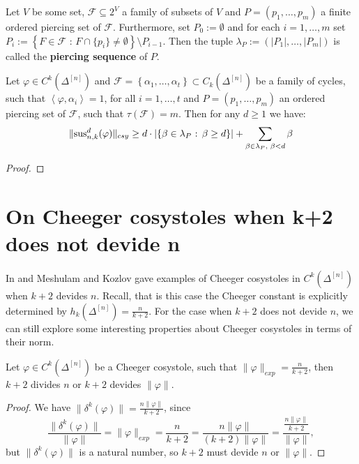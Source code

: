 \begin{defi}
Let \(V\) be some set, \(\mathcal{F}\subseteq 2^V\) a family of subsets of \(V\) and \(P=(p_1,\ldots,p_m)\) a finite ordered piercing set of \(\mathcal{F}\). Furthermore, set \(P_0:=\emptyset\) and for each \(i=1,\ldots,m\) set \(P_i:=\left\{F\in\mathcal{F}\text{ : }F\cap\{p_i\}\neq\emptyset\right\}\setminus P_{i-1}\). Then the tuple \(\lambda_P:=(|P_1|,\ldots,|P_m|)\) is called the \textbf{piercing sequence} of \(P\).
\end{defi}

\begin{prop}
Let \(\varphi\in C^k(\Delta^{[n]})\) and \(\mathcal{F}=\left\{\alpha_1,\ldots,\alpha_t\right\}\subset C_k(\Delta^{[n]})\) be a family of cycles, such that \(\left\langle\varphi,\alpha_i\right\rangle=1\), for all \(i=1,\ldots,t\) and \(P=(p_1,\ldots,p_m)\) an ordered piercing set of \(\mathcal{F}\), such that \(\tau(\mathcal{F})=m\). Then for any \(d\geq 1\) we have:
\[
\|\mathrm{sus}_{n,k}^d(\varphi)\|_{csy}\geq d\cdot\left|\left\{\beta\in\lambda_P\text{ : }\beta\geq d\right\}\right|+\sum\limits_{\beta\in\lambda_P\text{, }\beta<d}\beta
\]
\begin{proof}

\end{proof}
\end{prop}

\section{On Cheeger cosystoles when k+2 does not devide n}

In \cite{4} and \cite{6} Meshulam and Kozlov gave examples of Cheeger cosystoles in \(C^k(\Delta^{[n]})\) when \(k+2\) devides \(n\). Recall, that is this case the Cheeger constant is explicitly determined by \(h_k(\Delta^{[n]})=\frac{n}{k+2}\). For the case when \(k+2\) does not devide \(n\), we can still explore some interesting properties about Cheeger cosystoles in terms of their norm.

\begin{prop}
Let \(\varphi\in C^k(\Delta^{[n]})\) be a Cheeger cosystole, such that \(\|\varphi\|_{exp}=\frac{n}{k+2}\), then \(k+2\) divides \(n\) or \(k+2\) devides \(\|\varphi\|\).
\begin{proof}
We have \(\|\delta^k(\varphi)\|=\frac{n\|\varphi\|}{k+2}\), since
\[
\frac{\|\delta^k(\varphi)\|}{\|\varphi\|}=\|\varphi\|_{exp}=\frac{n}{k+2}=\frac{n\|\varphi\|}{(k+2)\|\varphi\|}=\frac{\frac{n\|\varphi\|}{k+2}}{\|\varphi\|},
\]
but \(\|\delta^k(\varphi)\|\) is a natural number, so \(k+2\) must devide \(n\) or \(\|\varphi\|\).
\end{proof}
\end{prop}
